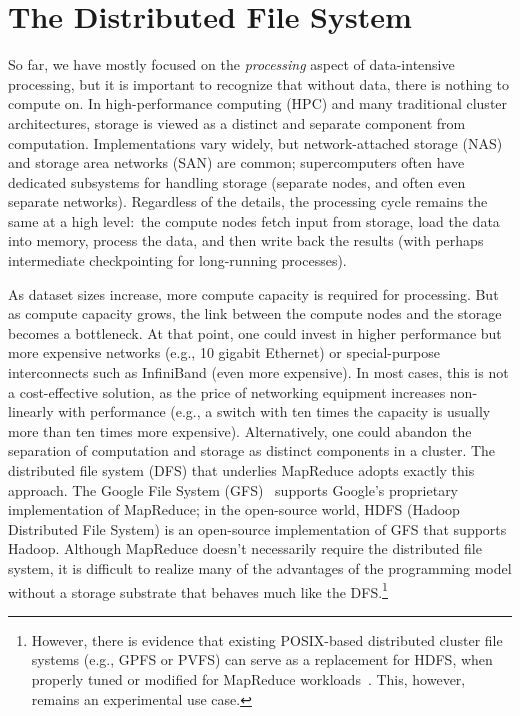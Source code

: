 \section{The Distributed File System}
\label{chapter2:dfs}

So far, we have mostly focused on the {\it processing} aspect of
data-intensive processing, but it is important to recognize that
without data, there is nothing to compute on.  In high-performance
computing (HPC) and many traditional cluster architectures, storage is
viewed as a distinct and separate component from computation.
Implementations vary widely, but network-attached storage (NAS) and
storage area networks (SAN) are common; supercomputers often have
dedicated subsystems for handling storage (separate nodes, and often
even separate networks).  Regardless of the details, the processing
cycle remains the same at a high level:\ the compute nodes fetch input
from storage, load the data into memory, process the data, and then
write back the results (with perhaps intermediate checkpointing for
long-running processes).

As dataset sizes increase, more compute capacity is required for
processing.  But as compute capacity grows, the link between the
compute nodes and the storage becomes a bottleneck.  At that point,
one could invest in higher performance but more expensive networks
(e.g., 10 gigabit Ethernet) or special-purpose interconnects such as
InfiniBand (even more expensive).  In most cases, this is not a
cost-effective solution, as the price of networking equipment
increases non-linearly with performance (e.g., a switch with ten times
the capacity is usually more than ten times more expensive).
Alternatively, one could abandon the separation of computation and
storage as distinct components in a cluster.  The distributed file
system (DFS) that underlies MapReduce adopts exactly this approach.
The Google File System (GFS)~\cite{Ghemawat_etal_SOSP2003} supports
Google's proprietary implementation of MapReduce; in the open-source
world, HDFS (Hadoop Distributed File System) is an open-source
implementation of GFS that supports Hadoop.  Although MapReduce
doesn't necessarily require the distributed file system, it is
difficult to realize many of the advantages of the programming model
without a storage substrate that behaves much like the
DFS.\footnote{However, there is evidence that existing POSIX-based
distributed cluster file systems (e.g., GPFS or PVFS) can serve as a
replacement for HDFS, when properly tuned or modified for MapReduce
workloads~\cite{Tantisiriroj_etal_2008,Ananthanarayanan_etal_2009}.
This, however, remains an experimental use case.}

